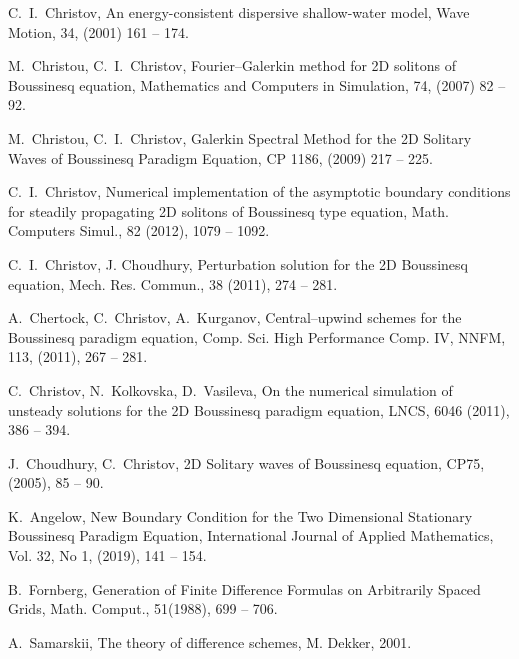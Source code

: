 \documentclass[leqno,11pt]{book}
\def\bibname{\rm R\,E\,F\,E\,R\,E\,N\,C\,E\,S} %
\begin{document}
\frenchspacing
\def\bibname{\rm R\,E\,F\,E\,R\,E\,N\,C\,E\,S}
\begin{thebibliography}{30}

C.~I.~Christov, An energy-consistent dispersive shallow-water model,
Wave Motion,  34, (2001) 161 -- 174.

M.~Christou, C.~I.~Christov, Fourier–Galerkin method for 2D solitons of Boussinesq equation, 
Mathematics and Computers in Simulation, 74, (2007) 82 -- 92.

M.~Christou, C.~I.~Christov, Galerkin Spectral Method for the 2D Solitary
Waves of Boussinesq Paradigm Equation, CP 1186, (2009) 217 -- 225.

C.~I.~Christov,  Numerical implementation of the asymptotic boundary conditions
for steadily propagating 2D solitons of   Boussinesq type equation,       
Math. Computers  Simul., 82 (2012),  1079 -- 1092.

C.~I.~Christov, J. Choudhury, Perturbation solution  for the 2D Boussinesq equation,       
Mech. Res. Commun., 38 (2011),  274 -- 281.

A.~Chertock, C.~Christov, A.~Kurganov, Central--upwind schemes for the  Boussinesq paradigm equation, Comp. Sci. High Performance Comp. IV, NNFM, 113, (2011), 267 -- 281.

C.~Christov, N.~Kolkovska, D.~Vasileva, On the numerical simulation of unsteady solutions for the 2D Boussinesq paradigm equation, LNCS, 6046  (2011), 386 -- 394.

J.~Choudhury, C.~Christov, 2D  Solitary waves of  Boussinesq equation, CP75, (2005), 85 -- 90.
 
K.~Angelow, New Boundary Condition for the Two Dimensional Stationary Boussinesq Paradigm Equation, 
International Journal of Applied Mathematics, Vol. 32, No 1, (2019), 141 -- 154.

B.~Fornberg, Generation of Finite Difference Formulas on Arbitrarily Spaced Grids, 
Math. Comput., 51(1988),  699 -- 706.

A.~Samarskii, The theory of difference schemes, M. Dekker,  2001.

\end{thebibliography}
\end{document}
